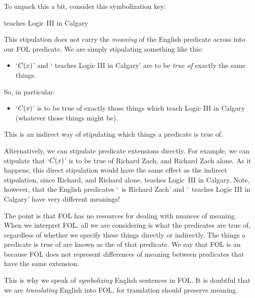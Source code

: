 To unpack this a bit, consider this symbolization key: 
	\begin{ekey}
		\item[\atom{C}{x}]  teaches Logic III in Calgary
	\end{ekey} 
This stipulation does not carry the \emph{meaning} of the English predicate across into our FOL predicate. We are simply stipulating something like this:
	\begin{itemize}
		\item `$\mathord{C}(x)$' and ` teaches Logic III in Calgary' are to be \emph{true of} exactly the same things.
	\end{itemize}
So, in particular:
	\begin{itemize}
		\item `$\mathord{C}(x)$' is to be true of exactly those things which teach Logic III in Calgary (whatever those things might be).
	\end{itemize}
This is an indirect way of stipulating which things a predicate is true of.

Alternatively, we can stipulate predicate extensions directly. For example, we can stipulate that `$\mathord{C}(x)$' is to be true of Richard Zach, and Richard Zach alone. As it happens, this direct stipulation would have the same effect as the indirect stipulation, since Richard, and Richard alone, teaches Logic~III in Calgary. Note, however, that the English predicates `\blank\ is Richard Zach' and `\blank\ teaches Logic III in Calgary' have very different meanings!

The point is that FOL has no resources for dealing with nuances of meaning. When we interpret FOL, all we are considering is what the predicates are true of, regardless of whether we specify these things directly or indirectly. The things a predicate is true of are known as the  of that predicate. We say that FOL is an  because FOL does not represent differences of meaning between predicates that have the same extension.    

This is why we speak of \emph{symbolizing} English sentences in FOL. It is doubtful that we are \emph{translating} English into FOL, for translation should preserve meaning.

